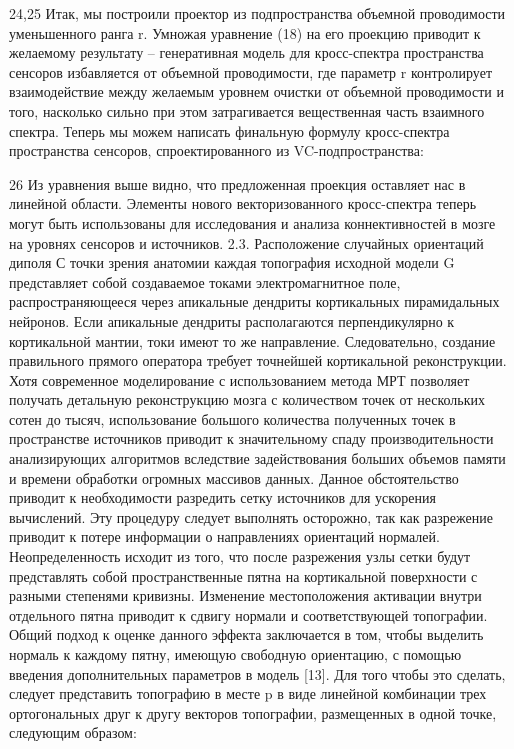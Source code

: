 24,25
Итак, мы построили проектор из подпространства объемной проводимости уменьшенного ранга r.
Умножая уравнение (18) на его проекцию приводит к желаемому результату – генеративная модель для кросс-спектра пространства сенсоров избавляется от объемной проводимости, где параметр r контролирует взаимодействие между желаемым уровнем очистки от объемной проводимости и того, насколько сильно при этом затрагивается вещественная часть взаимного спектра. Теперь мы можем написать финальную формулу кросс-спектра пространства сенсоров, спроектированного из VC-подпространства:

26
Из уравнения выше видно, что предложенная проекция оставляет нас в линейной области. Элементы нового векторизованного кросс-спектра теперь могут быть использованы для исследования и анализа коннективностей в мозге на уровнях сенсоров и источников.
2.3. Расположение случайных ориентаций диполя
С точки зрения анатомии каждая топография исходной модели G представляет собой создаваемое токами электромагнитное поле, распространяющееся через апикальные дендриты кортикальных пирамидальных нейронов. Если апикальные дендриты располагаются перпендикулярно к кортикальной мантии, токи имеют то же направление. Следовательно, создание правильного прямого оператора требует точнейшей кортикальной реконструкции. Хотя современное моделирование с использованием метода МРТ позволяет получать детальную реконструкцию мозга с количеством точек от нескольких сотен до тысяч, использование большого количества полученных точек в пространстве источников приводит к значительному спаду производительности анализирующих алгоритмов вследствие задействования больших объемов памяти и времени обработки огромных массивов данных.  
Данное обстоятельство приводит к необходимости разредить сетку источников для ускорения вычислений. Эту процедуру следует выполнять осторожно, так как разрежение приводит к потере информации о направлениях ориентаций нормалей. Неопределенность исходит из того, что после разрежения узлы сетки будут представлять собой пространственные пятна на кортикальной поверхности с разными степенями кривизны. Изменение местоположения активации внутри отдельного пятна приводит к сдвигу нормали и соответствующей топографии. Общий подход к оценке данного эффекта заключается в том, чтобы выделить нормаль к каждому пятну, имеющую свободную ориентацию, с помощью введения дополнительных параметров в модель [13].
Для того чтобы это сделать, следует представить топографию в месте p в виде линейной комбинации трех ортогональных друг к другу векторов топографии, размещенных в одной точке, следующим образом:

